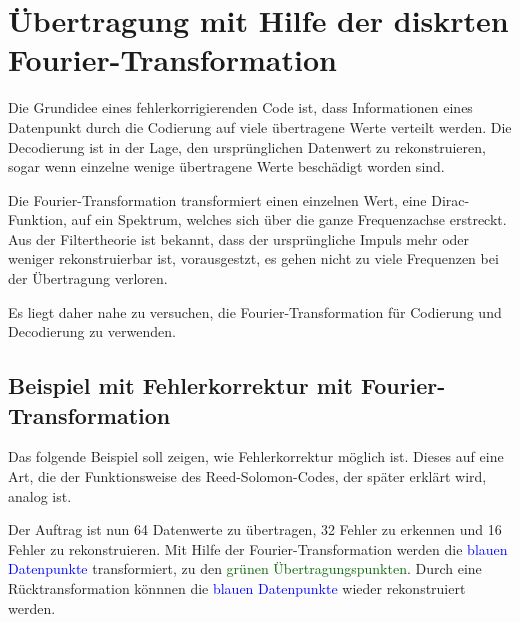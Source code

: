 %
%
\section{Übertragung mit Hilfe der diskrten Fourier-Transformation
\label{reedsolomon:section:dtf}}
Die Grundidee eines fehlerkorrigierenden Code ist, dass Informationen eines Datenpunkt
durch die Codierung auf viele übertragene Werte verteilt werden.
Die Decodierung ist in der Lage, den ursprünglichen Datenwert zu rekonstruieren,
sogar wenn einzelne wenige übertragene Werte beschädigt worden sind.
\par
Die Fourier-Transformation transformiert einen einzelnen Wert, 
eine Dirac-Funktion, auf ein Spektrum, welches sich über die ganze Frequenzachse erstreckt.
Aus der Filtertheorie ist bekannt, dass der ursprüngliche Impuls mehr oder weniger rekonstruierbar ist,
	vorausgestzt, es gehen nicht zu viele Frequenzen bei der Übertragung verloren.
\par
Es liegt daher nahe zu versuchen, die Fourier-Transformation 
für Codierung und Decodierung zu verwenden.

\subsection{Beispiel mit Fehlerkorrektur mit Fourier-Transformation
\label{reedsolomon:subsection:sendbsp}}

Das folgende Beispiel soll zeigen, wie Fehlerkorrektur möglich ist.
Dieses auf eine Art, die der Funktionsweise des Reed-Solomon-Codes,
der später erklärt wird, analog ist.
\par
Der Auftrag ist nun 64 Datenwerte zu übertragen, 32 Fehler zu erkennen und 16 Fehler zu rekonstruieren.
Mit Hilfe der Fourier-Transformation werden die \textcolor{blue}{blauen Datenpunkte} transformiert,
zu den \textcolor{darkgreen}{grünen Übertragungspunkten}. 
Durch eine Rücktransformation könnnen die \textcolor{blue}{blauen Datenpunkte} wieder rekonstruiert werden.

